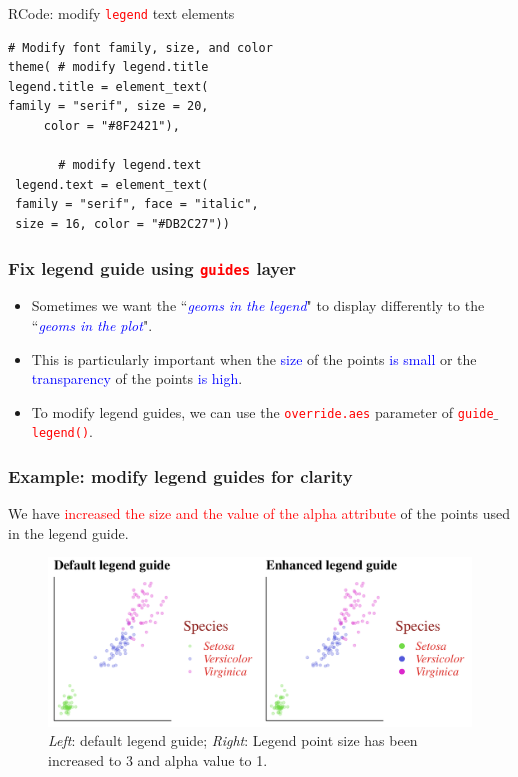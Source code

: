 \documentclass{beamer}
\begin{document}
\begin{frame}[fragile]{RCode: modify \texttt{\textcolor{red}{legend}} text elements}
\begin{lstlisting}
# Modify font family, size, and color
theme( # modify legend.title
legend.title = element_text(
family = "serif", size = 20, 
     color = "#8F2421"),
     
       # modify legend.text
 legend.text = element_text(
 family = "serif", face = "italic",
 size = 16, color = "#DB2C27"))
\end{lstlisting}
\end{frame}

\begin{frame}\frametitle{Fix legend guide using \texttt{\textcolor{red}{guides}} layer}
\Large
\begin{itemize}
\item Sometimes we want the ``\textcolor{blue}{\textit{geoms in the legend}}" to display differently to the ``\textcolor{blue}{\textit{geoms in the plot}}".

\vspace{0.3in}

\item<2-> This is particularly important when the \textcolor{blue}{size} of the points \textcolor{blue}{is small} or the \textcolor{blue}{transparency} of the points \textcolor{blue}{is high}.

\vspace{0.3in}

\item<3-> To modify legend guides, we can use the \texttt{\textcolor{red}{override.aes}} parameter of \texttt{\textcolor{red}{guide}$\_$\textcolor{red}{legend()}}.
\end{itemize}
\end{frame}

\begin{frame}\frametitle{Example: modify legend guides for clarity}
We have \textcolor{red}{increased the size and the value of the alpha attribute} of the points used in the legend guide. 
\begin{figure}
\includegraphics[width=0.99\linewidth]{PlotsLec3/LegGuide}
\caption{\small{\textit{Left}: default legend guide; \textit{Right}: Legend point size has been increased to 3 and alpha value to 1.}}
\end{figure}
\end{frame}
\end{document}
